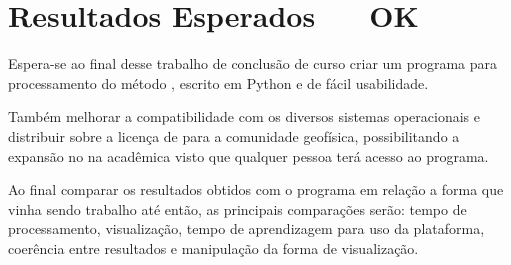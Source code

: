 \chapter{Resultados Esperados \,\,\,\,\,\,\, OK}
    \label{cap-resultados}
    Espera-se ao final desse trabalho de conclusão de curso criar um programa para processamento do método \MT, escrito em Python e de fácil usabilidade.
    
    Também melhorar a compatibilidade com os diversos sistemas operacionais e distribuir sobre a licença de  para a comunidade geofísica, possibilitando a expansão no \MT na acadêmica visto que qualquer pessoa terá acesso ao programa.
    
    Ao final comparar os resultados obtidos com o programa em relação a forma que vinha sendo trabalho até então, as principais comparações serão: tempo de processamento, visualização, tempo de aprendizagem para uso da plataforma, coerência entre resultados e manipulação da forma de visualização. 
    
    
